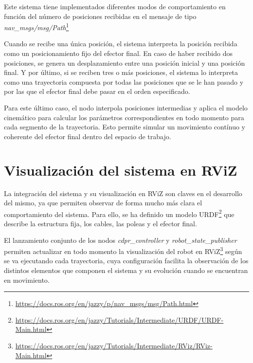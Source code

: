 \vspace{0.25cm}

Este sistema tiene implementados diferentes modos de comportamiento en función del número de posiciones recibidas en el mensaje de tipo \textit{nav\_msgs/msg/Path}\footnote{\url{https://docs.ros.org/en/jazzy/p/nav_msgs/msg/Path.html}}

\vspace{0.25cm}

Cuando se recibe una única posición, el sistema interpreta la posición recibida como un posicionamiento fijo del efector final. En caso de haber recibido dos posiciones, se genera un desplazamiento entre una posición inicial y una posición final. Y por último, si se reciben tres o más posiciones, el sistema lo interpreta como una trayectoria compuesta por todas las posiciones que se le han pasado y por las que el efector final debe pasar en el orden especificado.

\vspace{0.25cm}

Para este último caso, el nodo interpola posiciones intermedias y aplica el modelo cinemático para calcular los parámetros correspondientes en todo momento para cada segmento de la trayectoria. Esto permite simular un movimiento contínuo y coherente del efector final dentro del espacio de trabajo.

\newpage

\section{Visualización del sistema en RViZ}
\label{sec:segundaseccion}

La integración del sistema y su visualización en RViZ son claves en el desarrollo del mismo, ya que permiten observar de forma mucho más clara el comportamiento del sistema. Para ello, se ha definido un modelo URDF\footnote{\url{https://docs.ros.org/en/jazzy/Tutorials/Intermediate/URDF/URDF-Main.html}} que describe la estructura fija, los cables, las poleas y el efector final.

\vspace{0.25cm}

El lanzamiento conjunto de los nodos \textit{cdpr\_controller} y \textit{robot\_state\_publisher} permiten actualizar en todo momento la visualización del robot en RViZ\footnote{\url{https://docs.ros.org/en/jazzy/Tutorials/Intermediate/RViz/RViz-Main.html}} según se va ejecutando cada trayectoria, cuya configuración facilita la observación de los distintos elementos que componen el sistema y su evolución cuando se encuentran en movimiento.

